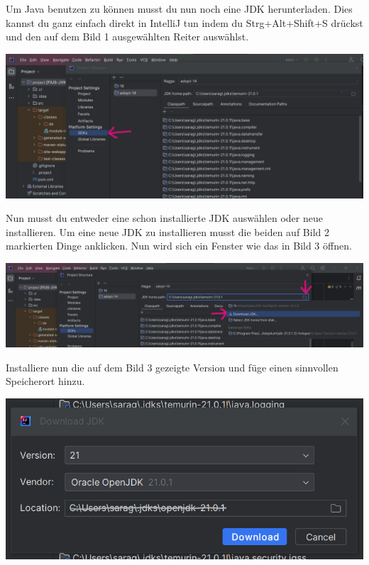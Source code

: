 
\label{ex1}
Um Java benutzen zu können musst du nun noch eine JDK herunterladen. Dies kannst du ganz einfach direkt in IntelliJ tun indem du Strg+Alt+Shift+S drückst und den auf dem Bild 1 ausgewählten Reiter auswählst.
\begin{center}
    \includegraphics[width=\linewidth]{./3/IntelliJ JDK.PNG}
\end{center}
Nun musst du entweder eine schon installierte JDK auswählen oder neue installieren. Um eine neue JDK zu installieren musst die beiden auf Bild 2 markierten Dinge anklicken. Nun wird sich ein Fenster wie das in Bild 3 öffnen.
\begin{center}
    \includegraphics[width=\linewidth]{./3/IntelliJ JDK 2.PNG}
\end{center}
\newpage
Installiere nun die auf dem Bild 3 gezeigte Version und füge einen sinnvollen Speicherort hinzu.
\begin{center}
    \includegraphics[width=\linewidth]{./3/IntelliJ JDK 3.PNG}
\end{center}
